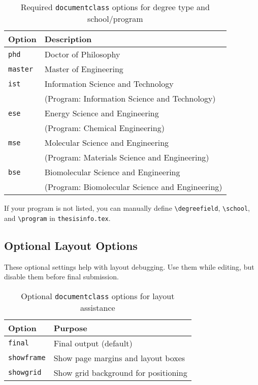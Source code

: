 \documentclass{VISTEC}
\begin{document}
\begin{table}[ht]
\centering
\caption{Required \texttt{documentclass} options for degree type and school/program}
\small\singlespacingplus
\begin{tabular}{ll}
\toprule
\textbf{Option} & \textbf{Description} \\
\midrule
\texttt{phd}    & Doctor of Philosophy \\
\texttt{master} & Master of Engineering \\
\midrule
\texttt{ist}    & Information Science and Technology \\
               & (Program: Information Science and Technology) \\
\texttt{ese}    & Energy Science and Engineering \\
               & (Program: Chemical Engineering) \\
\texttt{mse}    & Molecular Science and Engineering \\
               & (Program: Materials Science and Engineering) \\
\texttt{bse}    & Biomolecular Science and Engineering \\
               & (Program: Biomolecular Science and Engineering) \\
\bottomrule
\end{tabular}
\end{table}


\begin{subparagraph}
If your program is not listed, you can manually define \verb|\degreefield|, \verb|\school|, and \verb|\program| in \texttt{thesisinfo.tex}.
\end{subparagraph}

\subsection{Optional Layout Options}
\label{manual:class-optional}

\begin{subparagraph}
These optional settings help with layout debugging. Use them while editing, but disable them before final submission.
\end{subparagraph}

\begin{table}[ht]
\centering
\caption{Optional \texttt{documentclass} options for layout assistance}
\small\singlespacingplus
\begin{tabular}{ll}
\toprule
\textbf{Option} & \textbf{Purpose} \\
\midrule
\texttt{final}     & Final output (default) \\
\texttt{showframe} & Show page margins and layout boxes \\
\texttt{showgrid}  & Show grid background for positioning \\
\bottomrule
\end{tabular}
\end{table}
\end{document}
